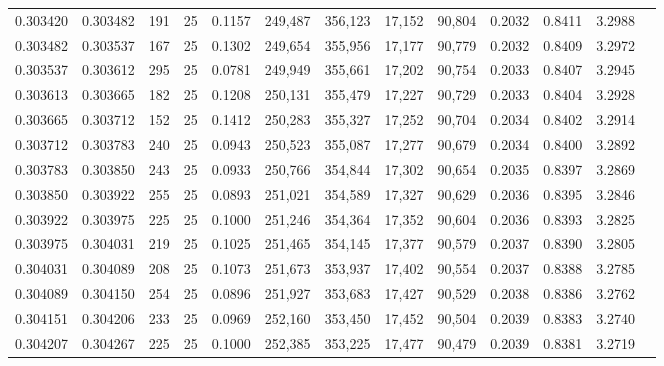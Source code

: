 \begin{tabular}{rrrrrrrrrrrrr}
0.303420 & 0.303482 &   191 &  25 &                                     0.1157 & 249,487 & 356,123 &  17,152 &  90,804 & 0.2032 & 0.8411 & 3.2988 \\
0.303482 & 0.303537 &   167 &  25 &                                     0.1302 & 249,654 & 355,956 &  17,177 &  90,779 & 0.2032 & 0.8409 & 3.2972 \\
0.303537 & 0.303612 &   295 &  25 &                                     0.0781 & 249,949 & 355,661 &  17,202 &  90,754 & 0.2033 & 0.8407 & 3.2945 \\
0.303613 & 0.303665 &   182 &  25 &                                     0.1208 & 250,131 & 355,479 &  17,227 &  90,729 & 0.2033 & 0.8404 & 3.2928 \\
0.303665 & 0.303712 &   152 &  25 &                                     0.1412 & 250,283 & 355,327 &  17,252 &  90,704 & 0.2034 & 0.8402 & 3.2914 \\
0.303712 & 0.303783 &   240 &  25 &                                     0.0943 & 250,523 & 355,087 &  17,277 &  90,679 & 0.2034 & 0.8400 & 3.2892 \\
0.303783 & 0.303850 &   243 &  25 &                                     0.0933 & 250,766 & 354,844 &  17,302 &  90,654 & 0.2035 & 0.8397 & 3.2869 \\
0.303850 & 0.303922 &   255 &  25 &                                     0.0893 & 251,021 & 354,589 &  17,327 &  90,629 & 0.2036 & 0.8395 & 3.2846 \\
0.303922 & 0.303975 &   225 &  25 &                                     0.1000 & 251,246 & 354,364 &  17,352 &  90,604 & 0.2036 & 0.8393 & 3.2825 \\
0.303975 & 0.304031 &   219 &  25 &                                     0.1025 & 251,465 & 354,145 &  17,377 &  90,579 & 0.2037 & 0.8390 & 3.2805 \\
0.304031 & 0.304089 &   208 &  25 &                                     0.1073 & 251,673 & 353,937 &  17,402 &  90,554 & 0.2037 & 0.8388 & 3.2785 \\
0.304089 & 0.304150 &   254 &  25 &                                     0.0896 & 251,927 & 353,683 &  17,427 &  90,529 & 0.2038 & 0.8386 & 3.2762 \\
0.304151 & 0.304206 &   233 &  25 &                                     0.0969 & 252,160 & 353,450 &  17,452 &  90,504 & 0.2039 & 0.8383 & 3.2740 \\
0.304207 & 0.304267 &   225 &  25 &                                     0.1000 & 252,385 & 353,225 &  17,477 &  90,479 & 0.2039 & 0.8381 & 3.2719 \\

\end{tabular}
